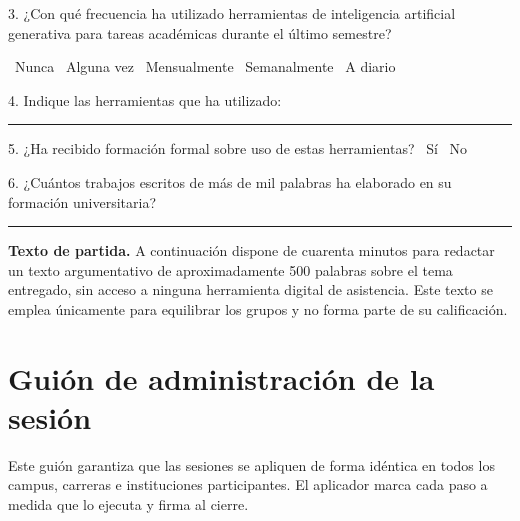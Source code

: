 \documentclass[12pt,a4paper,openany]{report}
\begin{document}
    \vspace{6pt}
    3. ¿Con qu\'e frecuencia ha utilizado herramientas de inteligencia artificial generativa para tareas acad\'emicas durante el \'ultimo semestre?
    
    \vspace{4pt}
    \fbox{\phantom{x}}\ Nunca \quad \fbox{\phantom{x}}\ Alguna vez \quad \fbox{\phantom{x}}\ Mensualmente \quad \fbox{\phantom{x}}\ Semanalmente \quad \fbox{\phantom{x}}\ A diario
    
    \vspace{8pt}
    4. Indique las herramientas que ha utilizado: \rule{8cm}{0.4pt}
    
    \vspace{6pt}
    5. ¿Ha recibido formaci\'on formal sobre uso de estas herramientas? \quad \fbox{\phantom{x}}\ S\'i \quad \fbox{\phantom{x}}\ No
    
    \vspace{6pt}
    6. ¿Cu\'antos trabajos escritos de m\'as de mil palabras ha elaborado en su formaci\'on universitaria? \rule{2.5cm}{0.4pt}
    
    \vspace{10pt}
    \textbf{Texto de partida.} A continuaci\'on dispone de cuarenta minutos para redactar un texto argumentativo de aproximadamente 500 palabras sobre el tema entregado, sin acceso a ninguna herramienta digital de asistencia. Este texto se emplea \'unicamente para equilibrar los grupos y no forma parte de su calificaci\'on.
    
    \chapter{Gui\'on de administraci\'on de la sesi\'on}
    \label{anx:guion}
    
    Este gui\'on garantiza que las sesiones se apliquen de forma id\'entica en todos los campus, carreras e instituciones participantes. El aplicador marca cada paso a medida que lo ejecuta y firma al cierre.
    
\end{document}
